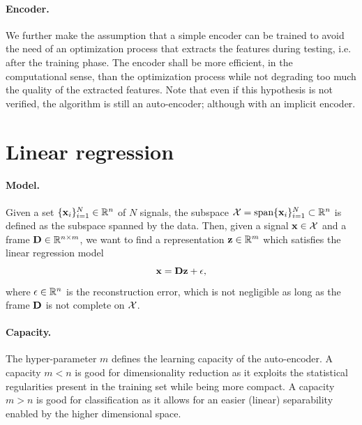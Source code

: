 \paragraph{Encoder.}
We further make the assumption that a simple encoder can be trained to avoid the need of an optimization process that extracts the features during testing, i.e. after the training phase. The encoder shall be more efficient, in the computational sense, than the optimization process while not degrading too much the quality of the extracted features. Note that even if this hypothesis is not verified, the algorithm is still an auto-encoder; although with an implicit encoder.

\section{Linear regression} \label{sec:linear_regression}

\paragraph{Model.}
Given a set $\{\mathbf{x}_i\}_{i=1}^N \in \mathbb{R}^n$ of $N$ signals, the subspace $\mathcal{X} = \operatorname*{span} \{\mathbf{x}_i\}_{i=1}^N \subset \mathbb{R}^n$ is defined as the subspace spanned by the data. Then, given a signal $\mathbf{x} \in \mathcal{X}$ and a frame $\mathbf{D} \in \mathbb{R}^{n \times m}$, we want to find a representation $\mathbf{z} \in \mathbb{R}^m$ which satisfies the linear regression model
\begin{equation} \label{eqn:linear_regression}
	\mathbf{x} = \mathbf{D} \mathbf{z} + \mathbf{\epsilon},
\end{equation}
where $\mathbf{\epsilon} \in \mathbb{R}^n$ is the reconstruction error, which is not negligible as long as the frame $\mathbf{D}$ is not complete on $\mathcal{X}$.

\paragraph{Capacity.} The hyper-parameter $m$ defines the learning capacity of the auto-encoder. A capacity $m < n$ is good for dimensionality reduction as it exploits the statistical regularities present in the training set while being more compact. A capacity $m > n$ is good for classification as it allows for an easier (linear) separability enabled by the higher dimensional space.

